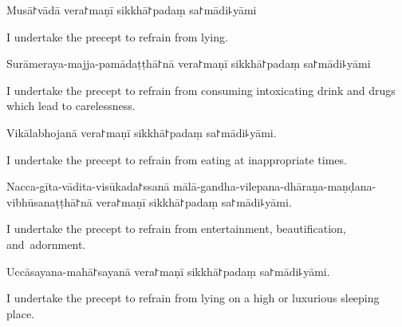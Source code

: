 \clearpage

\begin{precept}
  \setcounter{enumi}{3}
  \item Musā꜓vādā vera꜓maṇī sikkhā꜓padaṃ sa꜓mādi꜕yāmi
\end{precept}

\begin{english}
  I undertake the precept to refrain from lying.
\end{english}

\begin{precept}
  \setcounter{enumi}{4}
  \item Surāmeraya-majja-pamādaṭṭhā꜓nā vera꜓maṇī sikkhā꜓padaṃ sa꜓mādi꜕yāmi
\end{precept}

\begin{english}
  I undertake the precept to refrain from consuming intoxicating drink and drugs which lead to carelessness.
\end{english}

\begin{precept}
  \setcounter{enumi}{5}
  \item Vikālabhojanā vera꜓maṇī sikkhā꜓padaṃ sa꜓mādi꜕yāmi.
\end{precept}

\begin{english}
  I undertake the precept to refrain from eating at inappropriate times.
\end{english}

\begin{precept}
  \setcounter{enumi}{6}
  \item Nacca-gīta-vādita-visūkada꜓ssanā mālā-gandha-vilepana-dhāraṇa-maṇḍana-vibhūsanaṭṭhā꜓nā vera꜓maṇī sikkhā꜓padaṃ sa꜓mādi꜕yāmi.
\end{precept}

\begin{english}
  I undertake the precept to refrain from entertainment, beautification, and~adornment.
\end{english}

\begin{precept}
  \setcounter{enumi}{7}
  \item Uccāsayana-mahā꜓sayanā vera꜓maṇī sikkhā꜓padaṃ sa꜓mādi꜕yāmi.
\end{precept}

\begin{english}
  I undertake the precept to refrain from lying on a high or luxurious sleeping place.
\end{english}

